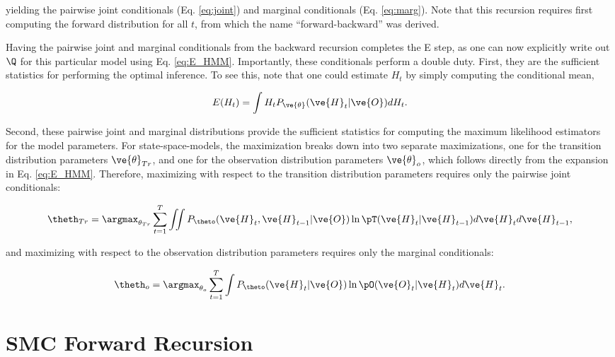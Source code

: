 \documentclass{article}
\begin{document}
\noindent yielding the pairwise joint conditionals (Eq. \ref{eq:joint}) and marginal conditionals (Eq. \ref{eq:marg}).  Note that this recursion requires first computing the forward distribution for all $t$, from which the name ``forward-backward'' was derived.

Having the pairwise joint and marginal conditionals from the backward recursion completes the E step, as one can now explicitly write out $\Q$ for this particular model using Eq. \ref{eq:E_HMM}.  Importantly, these conditionals perform a double duty.  First, they are the sufficient statistics for performing the optimal inference.  To see this, note that one could estimate $H_t$ by simply computing the conditional mean,

\begin{align} \label{eq:inf}
E(H_t) = \int H_t P_{\ve{\theta}}(\ve{H}_t | \ve{O}) dH_t.
\end{align}

\noindent Second, these pairwise joint and marginal distributions provide the sufficient statistics for computing the maximum likelihood estimators for the model parameters.  For state-space-models, the maximization breaks down into two separate maximizations, one for the transition distribution parameters $\ve{\theta}_{Tr}$, and one for the observation distribution parameters $\ve{\theta}_o$, which follows directly from the expansion in Eq. \ref{eq:E_HMM}.  Therefore, maximizing with respect to the transition distribution parameters requires only the pairwise joint conditionals:

\begin{align}\label{eq:QT}
\theth_{Tr} = \argmax_{\theta_{Tr}} \sum_{t=1}^T \iint %
P_{\theto} (\ve{H}_t,\ve{H}_{t-1} | \ve{O})  \ln \pT (\ve{H}_t |  \ve{H}_{t-1}) d\ve{H}_t d\ve{H}_{t-1},
\end{align}

\noindent and maximizing with respect to the observation distribution parameters requires only the marginal conditionals:

\begin{align}\label{eq:QO}
\theth_o = \argmax_{\theta_o} \sum_{t=1}^T\int %
P_{\theto} (\ve{H}_t | \ve{O})  \ln \pO (\ve{O}_t |  \ve{H}_t) d\ve{H}_t.
\end{align}

\section{SMC Forward Recursion}
\end{document}
